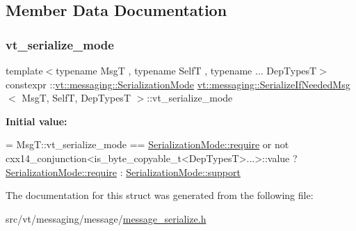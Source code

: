 \subsection{Member Data Documentation}
\mbox{\label{structvt_1_1messaging_1_1_serialize_if_needed_msg_aae6c39c834f1aa059dadd77324ca750b}} 
\subsubsection{\texorpdfstring{vt\+\_\+serialize\+\_\+mode}{vt\_serialize\_mode}}
{\footnotesize\ttfamily template$<$typename MsgT , typename SelfT , typename ... Dep\+TypesT$>$ \\
constexpr \+::\hyperlink{namespacevt_1_1messaging_a436c5b9fc7f591e5978a136999cb9ef8}{vt\+::messaging\+::\+Serialization\+Mode} \hyperlink{structvt_1_1messaging_1_1_serialize_if_needed_msg}{vt\+::messaging\+::\+Serialize\+If\+Needed\+Msg}$<$ MsgT, SelfT, Dep\+TypesT $>$\+::vt\+\_\+serialize\+\_\+mode\hspace{0.3cm}{\ttfamily [static]}}

{\bfseries Initial value\+:}
\begin{DoxyCode}
= MsgT::vt\_serialize\_mode == \hyperlink{namespacevt_1_1messaging_a436c5b9fc7f591e5978a136999cb9ef8af0ffd3b7c2574ac324603ed00488c850}{SerializationMode::require}
    or not cxx14\_conjunction<is\_byte\_copyable\_t<DepTypesT>...>::value
    ? \hyperlink{namespacevt_1_1messaging_a436c5b9fc7f591e5978a136999cb9ef8af0ffd3b7c2574ac324603ed00488c850}{SerializationMode::require}
    : \hyperlink{namespacevt_1_1messaging_a436c5b9fc7f591e5978a136999cb9ef8a434990c8a25d2be94863561ae98bd682}{SerializationMode::support}
\end{DoxyCode}


The documentation for this struct was generated from the following file\+:\begin{DoxyCompactItemize}
\item 
src/vt/messaging/message/\hyperlink{message__serialize_8h}{message\+\_\+serialize.\+h}\end{DoxyCompactItemize}
